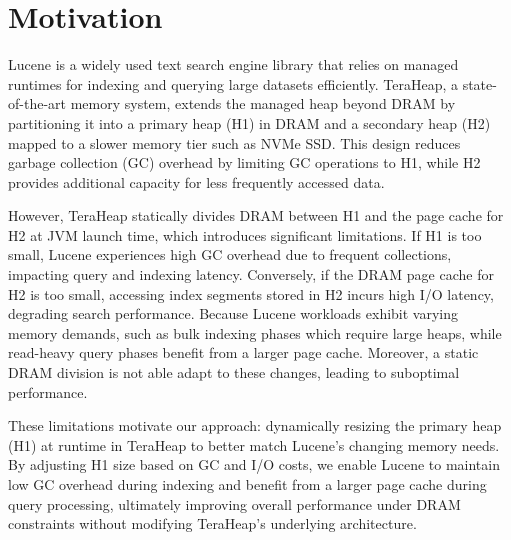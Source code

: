 \section{Motivation}
Lucene is a widely used text search engine library that relies on managed runtimes for indexing and querying large datasets efficiently. TeraHeap, a state-of-the-art memory system, extends the managed heap beyond DRAM by partitioning it into a primary heap (H1) in DRAM and a secondary heap (H2) mapped to a slower memory tier such as NVMe SSD. This design reduces garbage collection (GC) overhead by limiting GC operations to H1, while H2 provides additional capacity for less frequently accessed data.

However, TeraHeap statically divides DRAM between H1 and the page cache for H2 at JVM launch time, which introduces significant limitations. If H1 is too small, Lucene experiences high GC overhead due to frequent collections, impacting query and indexing latency. Conversely, if the DRAM page cache for H2 is too small, accessing index segments stored in H2 incurs high I/O latency, degrading search performance. Because Lucene workloads exhibit varying memory demands, such as bulk indexing phases which require large heaps, while read-heavy query phases benefit from a larger page cache. Moreover, a static DRAM division is not able adapt to these changes, leading to suboptimal performance.

These limitations motivate our approach: dynamically resizing the primary heap (H1) at runtime in TeraHeap to better match Lucene’s changing memory needs. By adjusting H1 size based on GC and I/O costs, we enable Lucene to maintain low GC overhead during indexing and benefit from a larger page cache during query processing, ultimately improving overall performance under DRAM constraints without modifying TeraHeap’s underlying architecture.
